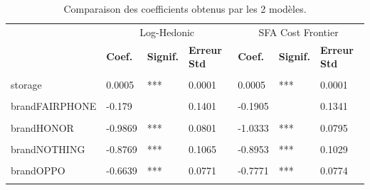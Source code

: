 \documentclass[
  12pt,
]{report}
\begin{document}
\begin{table}[!h]

\caption{\label{tab:loghedonic_sfa_comp}Comparaison des coefficients obtenus par les 2 modèles.}
\centering
\begin{tabular}[t]{lllllll}
\toprule
\multicolumn{1}{c}{ } & \multicolumn{3}{c}{Log-Hedonic} & \multicolumn{3}{c}{SFA Cost Frontier} \\
\cmidrule(l{3pt}r{3pt}){2-4} \cmidrule(l{3pt}r{3pt}){5-7}
\textbf{ } & \textbf{Coef.} & \textbf{Signif.} & \textbf{Erreur Std} & \textbf{Coef.} & \textbf{Signif.} & \textbf{Erreur Std}\\
\midrule
\cellcolor{gray!6}{(Intercept)} & \cellcolor{gray!6}{4.3197} & \cellcolor{gray!6}{***} & \cellcolor{gray!6}{0.2526} & \cellcolor{gray!6}{4.116} & \cellcolor{gray!6}{***} & \cellcolor{gray!6}{0.2456}\\
storage & 0.0005 & *** & 0.0001 & 0.0005 & *** & 0.0001\\
\cellcolor{gray!6}{brandASUS} & \cellcolor{gray!6}{-0.357} & \cellcolor{gray!6}{**} & \cellcolor{gray!6}{0.1091} & \cellcolor{gray!6}{-0.3969} & \cellcolor{gray!6}{***} & \cellcolor{gray!6}{0.1093}\\
brandFAIRPHONE & -0.179 &  & 0.1401 & -0.1905 &  & 0.1341\\
\cellcolor{gray!6}{brandGOOGLE} & \cellcolor{gray!6}{-0.4298} & \cellcolor{gray!6}{***} & \cellcolor{gray!6}{0.0897} & \cellcolor{gray!6}{-0.5307} & \cellcolor{gray!6}{***} & \cellcolor{gray!6}{0.0883}\\
\addlinespace
brandHONOR & -0.9869 & *** & 0.0801 & -1.0333 & *** & 0.0795\\
\cellcolor{gray!6}{brandMOTOROLA} & \cellcolor{gray!6}{-0.7181} & \cellcolor{gray!6}{***} & \cellcolor{gray!6}{0.0732} & \cellcolor{gray!6}{-0.8242} & \cellcolor{gray!6}{***} & \cellcolor{gray!6}{0.0754}\\
brandNOTHING & -0.8769 & *** & 0.1065 & -0.8953 & *** & 0.1029\\
\cellcolor{gray!6}{brandONEPLUS} & \cellcolor{gray!6}{-0.6518} & \cellcolor{gray!6}{***} & \cellcolor{gray!6}{0.1065} & \cellcolor{gray!6}{-0.6939} & \cellcolor{gray!6}{***} & \cellcolor{gray!6}{0.104}\\
brandOPPO & -0.6639 & *** & 0.0771 & -0.7771 & *** & 0.0774\\
\addlinespace
\cellcolor{gray!6}{brandREALME} & \cellcolor{gray!6}{-0.6436} & \cellcolor{gray!6}{***} & \cellcolor{gray!6}{0.0795} & \cellcolor{gray!6}{-0.6867} & \cellcolor{gray!6}{***} & \cellcolor{gray!6}{0.0777}\\

\end{tabular}
\end{table}
\end{document}
